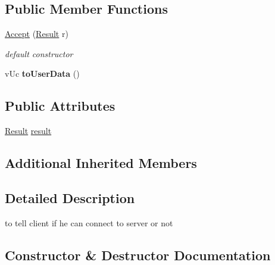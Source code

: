 \subsection*{Public Member Functions}
\begin{DoxyCompactItemize}
\item 
\hyperlink{class_network_1_1_messages_1_1_accept_a53080bfd6fec0804e6f7c3b64f00d615}{Accept} (\hyperlink{class_network_1_1_messages_1_1_base_a646d774928c7dfac987228f26ab5d46a}{Result} r)
\begin{DoxyCompactList}\small\item\em default constructor \end{DoxyCompactList}\item 
\mbox{\label{class_network_1_1_messages_1_1_accept_aa47e1761188fe26ccec89d8c7b407e7b}} 
v\+Uc {\bfseries to\+User\+Data} ()
\end{DoxyCompactItemize}
\subsection*{Public Attributes}
\begin{DoxyCompactItemize}
\item 
\hyperlink{class_network_1_1_messages_1_1_base_a646d774928c7dfac987228f26ab5d46a}{Result} \hyperlink{class_network_1_1_messages_1_1_accept_ac177c23980f913c99190ffe445f7963b}{result}
\end{DoxyCompactItemize}
\subsection*{Additional Inherited Members}


\subsection{Detailed Description}
to tell client if he can connect to server or not 

\subsection{Constructor \& Destructor Documentation}
\mbox{\label{class_network_1_1_messages_1_1_accept_a53080bfd6fec0804e6f7c3b64f00d615}} 
